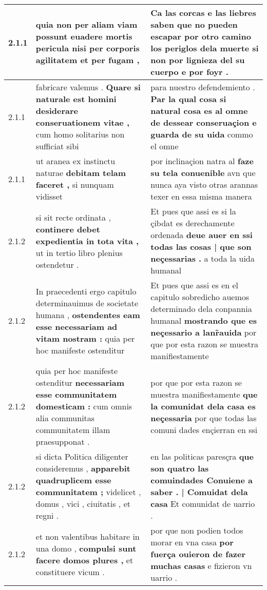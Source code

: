 \begin{tabular}{|p{1cm}|p{6.5cm}|p{6.5cm}|}
2.1.1 & quia non per aliam viam possunt \textbf{ euadere mortis pericula } nisi per corporis agilitatem et per fugam , & Ca las corcas e las liebres saben \textbf{ que no pueden escapar por otro camino los periglos dela muerte } si non por lignieza del su cuerpo e por foyr . \\\hline
2.1.1 & fabricare valemus . \textbf{ Quare si naturale est homini desiderare conseruationem vitae , } cum homo solitarius non sufficiat sibi & para nuestro defendemiento . \textbf{ Par la qual cosa si natural cosa es al omne de dessear conseruaçion e guarda de su uida } commo el omne \\\hline
2.1.1 & ut aranea ex instinctu naturae \textbf{ debitam telam faceret , } si nunquam vidisset & por inclinaçion natra al \textbf{ faze su tela conuenible } avn que nunca aya visto otras arannas texer en essa misma manera \\\hline
2.1.2 & si sit recte ordinata , \textbf{ continere debet expedientia in tota vita , } ut in tertio libro plenius ostendetur . & Et pues que assi es si la çibdat es derechamente ordenada \textbf{ deue auer en ssi todas las cosas | que son neçessarias . } a toda la uida humanal \\\hline
2.1.2 & In praecedenti ergo capitulo determinauimus de societate humana , \textbf{ ostendentes eam esse necessariam ad vitam nostram : } quia per hoc manifeste ostenditur & Et pues que assi es en el capitulo sobredicho auemos determinado dela conpannia humanal \textbf{ mostrando que es neçessario a lanr̃auida } por que por esta razon se muestra manifiestamente \\\hline
2.1.2 & quia per hoc manifeste ostenditur \textbf{ necessariam esse communitatem domesticam : } cum omnis alia communitas communitatem illam praesupponat . & por que por esta razon se muestra manifiestamente \textbf{ que la comunidat dela casa es neçessaria } por que todas las comuni dades ençierran en ssi \\\hline
2.1.2 & si dicta Politica diligenter consideremus , \textbf{ apparebit quadruplicem esse communitatem ; } videlicet , domus , vici , ciuitatis , et regni . & en las politicas paresçra \textbf{ que son quatro las comuindades Conuiene a saber . | Comuidat dela casa } Et comunidat de uarrio . \\\hline
2.1.2 & et non valentibus habitare in una domo , \textbf{ compulsi sunt facere domos plures , } et constituere vicum . & por que non podien todos morar en vna casa \textbf{ por fuerça ouieron de fazer muchas casas } e fizieron vn uarrio . \\\hline

\end{tabular}

